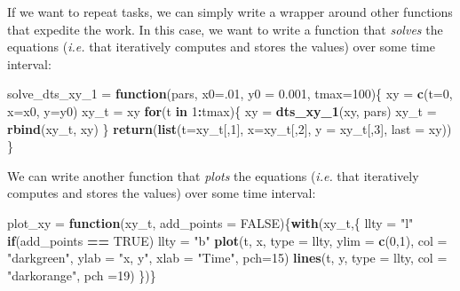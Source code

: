 \documentclass[
]{book}
\newenvironment{Shaded}{\begin{snugshade}}{\end{snugshade}}
\newcommand{\AttributeTok}[1]{\textcolor[rgb]{0.13,0.29,0.53}{#1}}
\newcommand{\ConstantTok}[1]{\textcolor[rgb]{0.56,0.35,0.01}{#1}}
\newcommand{\ControlFlowTok}[1]{\textcolor[rgb]{0.13,0.29,0.53}{\textbf{#1}}}
\newcommand{\DecValTok}[1]{\textcolor[rgb]{0.00,0.00,0.81}{#1}}
\newcommand{\FloatTok}[1]{\textcolor[rgb]{0.00,0.00,0.81}{#1}}
\newcommand{\FunctionTok}[1]{\textcolor[rgb]{0.13,0.29,0.53}{\textbf{#1}}}
\newcommand{\NormalTok}[1]{#1}
\newcommand{\OtherTok}[1]{\textcolor[rgb]{0.56,0.35,0.01}{#1}}
\newcommand{\SpecialCharTok}[1]{\textcolor[rgb]{0.81,0.36,0.00}{\textbf{#1}}}
\newcommand{\StringTok}[1]{\textcolor[rgb]{0.31,0.60,0.02}{#1}}
\begin{document}
If we want to repeat tasks, we can simply write a wrapper around other functions that expedite the work. In this case, we want to write a function that \emph{solves} the equations (\emph{i.e.} that iteratively computes and stores the values) over some time interval:

\begin{Shaded}
\begin{Highlighting}[]
\NormalTok{solve\_dts\_xy\_1 }\OtherTok{=} \ControlFlowTok{function}\NormalTok{(pars, }\AttributeTok{x0=}\NormalTok{.}\DecValTok{01}\NormalTok{, }\AttributeTok{y0 =} \FloatTok{0.001}\NormalTok{, }\AttributeTok{tmax=}\DecValTok{100}\NormalTok{)\{}
\NormalTok{   xy }\OtherTok{=} \FunctionTok{c}\NormalTok{(}\AttributeTok{t=}\DecValTok{0}\NormalTok{, }\AttributeTok{x=}\NormalTok{x0, }\AttributeTok{y=}\NormalTok{y0) }
\NormalTok{   xy\_t }\OtherTok{=}\NormalTok{ xy }
   \ControlFlowTok{for}\NormalTok{(t }\ControlFlowTok{in} \DecValTok{1}\SpecialCharTok{:}\NormalTok{tmax)\{}
\NormalTok{     xy }\OtherTok{=} \FunctionTok{dts\_xy\_1}\NormalTok{(xy, pars)}
\NormalTok{     xy\_t }\OtherTok{=} \FunctionTok{rbind}\NormalTok{(xy\_t, xy)}
\NormalTok{   \}}
   \FunctionTok{return}\NormalTok{(}\FunctionTok{list}\NormalTok{(}\AttributeTok{t=}\NormalTok{xy\_t[,}\DecValTok{1}\NormalTok{], }\AttributeTok{x=}\NormalTok{xy\_t[,}\DecValTok{2}\NormalTok{], }\AttributeTok{y =}\NormalTok{ xy\_t[,}\DecValTok{3}\NormalTok{], }\AttributeTok{last =}\NormalTok{ xy)) }
\NormalTok{\}}
\end{Highlighting}
\end{Shaded}

We can write another function that \emph{plots} the equations (\emph{i.e.} that iteratively computes and stores the values) over some time interval:

\begin{Shaded}
\begin{Highlighting}[]
\NormalTok{plot\_xy }\OtherTok{=} \ControlFlowTok{function}\NormalTok{(xy\_t, }\AttributeTok{add\_points =} \ConstantTok{FALSE}\NormalTok{)\{}\FunctionTok{with}\NormalTok{(xy\_t,\{}
\NormalTok{  llty }\OtherTok{=} \StringTok{"l"}
  \ControlFlowTok{if}\NormalTok{(add\_points }\SpecialCharTok{==} \ConstantTok{TRUE}\NormalTok{) llty }\OtherTok{=} \StringTok{"b"}
  \FunctionTok{plot}\NormalTok{(t, x, }\AttributeTok{type =}\NormalTok{ llty, }\AttributeTok{ylim =} \FunctionTok{c}\NormalTok{(}\DecValTok{0}\NormalTok{,}\DecValTok{1}\NormalTok{), }\AttributeTok{col =} \StringTok{"darkgreen"}\NormalTok{, }\AttributeTok{ylab =} \StringTok{"x, y"}\NormalTok{, }\AttributeTok{xlab =} \StringTok{"Time"}\NormalTok{, }\AttributeTok{pch=}\DecValTok{15}\NormalTok{)}
  \FunctionTok{lines}\NormalTok{(t, y, }\AttributeTok{type =}\NormalTok{ llty, }\AttributeTok{col =} \StringTok{"darkorange"}\NormalTok{, }\AttributeTok{pch =}\DecValTok{19}\NormalTok{)}
\NormalTok{\})\}}
\end{Highlighting}
\end{Shaded}
\end{document}
